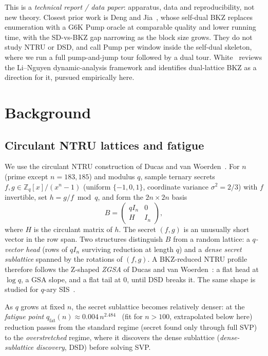 \documentclass[journal=cic,version=preprint]{iacrj}
\begin{document}
This is a \emph{technical report / data paper}: apparatus, data and
reproducibility, not new theory. Closest prior work is Deng and
Jia~\cite{DengJia2023}, whose self-dual BKZ replaces enumeration with a G6K
Pump oracle at comparable quality and lower running time, with the SD-vs-BKZ
gap narrowing as the block size grows. They do not study NTRU or DSD, and call
Pump per window inside the self-dual skeleton, where we run a full
pump-and-jump tour followed by a dual tour.
White~\cite{White26} reviews the Li--Nguyen dynamic-analysis framework and
identifies dual-lattice BKZ as a direction for it, pursued empirically here.

\section{Background}
\label{sec:background}

\subsection{Circulant NTRU lattices and fatigue}
\label{sec:bg-ntru}
We use the circulant NTRU construction of Ducas and van
Woerden~\cite{DucasWoerden2021}. For $n$ (prime except $n=183,185$) and modulus $q$, sample
ternary secrets $f,g\in\mathbb{Z}_q[x]/(x^n-1)$ (uniform $\{-1,0,1\}$,
coordinate variance $\sigma^2=2/3$) with $f$ invertible, set $h=g/f \bmod q$,
and form the $2n\times2n$ basis
\[
B=\begin{pmatrix} q I_n & 0 \\ H & I_n \end{pmatrix},
\]
where $H$ is the circulant matrix of $h$. The secret $(f,g)$ is an unusually
short vector in the row span. Two structures distinguish $B$ from a random
lattice: a \emph{$q$-vector head} (rows of $qI_n$ surviving reduction at length
$q$) and a \emph{dense secret sublattice} spanned by the rotations of $(f,g)$.
A BKZ-reduced NTRU profile therefore follows the Z-shaped \emph{ZGSA} of
Ducas and van Woerden~\cite{DucasWoerden2021}: a flat head at $\log q$, a GSA
slope, and a flat tail at $0$, until DSD breaks it. The same shape is studied
for $q$-ary SIS~\cite{DEP2023}.

As $q$ grows at fixed $n$, the secret sublattice becomes relatively denser: at
the \emph{fatigue point}
$q_\mathrm{fat}(n)\approx0.004\,n^{2.484}$~\cite{DucasWoerden2021} (fit for
$n>100$, extrapolated below here) reduction passes from the standard regime
(secret found only through full SVP) to the \emph{overstretched} regime, where
it discovers the dense sublattice (\emph{dense-sublattice discovery}, DSD)
before solving SVP.
\end{document}
